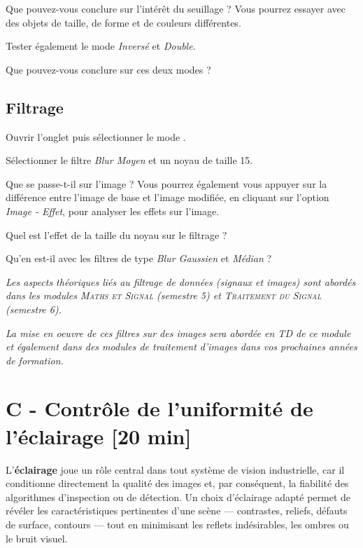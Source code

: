 \Quest Que pouvez-vous conclure sur l'intérêt du seuillage ? Vous pourrez essayer avec des objets de taille, de forme et de couleurs différentes.

\Manip Tester également le mode \textsl{Inversé} et \textsl{Double}.

\Quest Que pouvez-vous conclure sur ces deux modes ?
 

\subsection{Filtrage}

\Manip Ouvrir l'onglet  puis sélectionner le mode .

\Manip Sélectionner le filtre \textsl{Blur Moyen} et un noyau de taille 15.

\Quest Que se passe-t-il sur l'image ? Vous pourrez également vous appuyer sur la différence entre l'image de base et l'image modifiée, en cliquant sur l'option \textsl{Image - Effet}, pour analyser les effets sur l'image.

\Quest Quel est l'effet de la taille du noyau sur le filtrage ?

\Quest Qu'en est-il avec les filtres de type \textsl{Blur Gaussien} et \textsl{Médian} ? 

\vfill

\textit{Les aspects théoriques liés au filtrage de données (signaux et images) sont abordés dans les modules \textsc{Maths et Signal} (semestre 5) et \textsc{Traitement du Signal} (semestre 6).}

\textit{La mise en oeuvre de ces filtres sur des images sera abordée en TD de ce module et également dans des modules de traitement d'images dans vos prochaines années de formation.}


\newpage
\section{C - Contrôle de l'uniformité de l'éclairage {[20 min]}}

L'\textbf{éclairage} joue un rôle central dans tout système de vision industrielle, car il conditionne directement la qualité des images et, par conséquent, la fiabilité des algorithmes d'inspection ou de détection. Un choix d'éclairage adapté permet de révéler les caractéristiques pertinentes d'une scène — contrastes, reliefs, défauts de surface, contours — tout en minimisant les reflets indésirables, les ombres ou le bruit visuel. 

